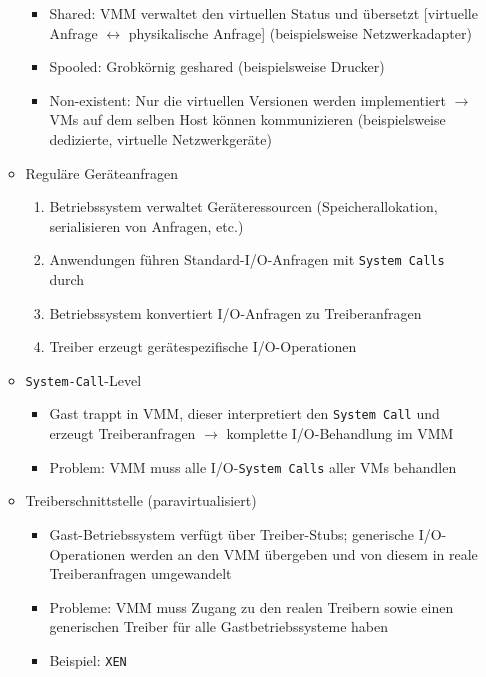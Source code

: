 \begin{itemize}
\begin{itemize}
\begin{itemize}
			\item Shared: VMM verwaltet den virtuellen Status und übersetzt [virtuelle Anfrage \(\leftrightarrow\) physikalische Anfrage] (beispielsweise Netzwerkadapter)
			\item Spooled: Grobkörnig geshared (beispielsweise Drucker)
			\item Non-existent: Nur die virtuellen Versionen werden implementiert \(\rightarrow\) VMs auf dem selben Host können kommunizieren (beispielsweise dedizierte, virtuelle Netzwerkgeräte)
		\end{itemize}
		\item Reguläre Geräteanfragen
		\begin{enumerate}
			\item Betriebssystem verwaltet Geräteressourcen (Speicherallokation, serialisieren von Anfragen, etc.)
			\item Anwendungen führen Standard-I/O-Anfragen mit \texttt{System Calls} durch
			\item Betriebssystem konvertiert I/O-Anfragen zu Treiberanfragen
			\item Treiber erzeugt gerätespezifische I/O-Operationen
		\end{enumerate}
		\item \texttt{System-Call}-Level
		\begin{itemize}
			\item Gast trappt in VMM, dieser interpretiert den \texttt{System Call} und erzeugt Treiberanfragen \(\rightarrow\) komplette I/O-Behandlung im VMM
			\item Problem: VMM muss alle I/O-\texttt{System Calls} aller VMs behandlen
		\end{itemize}
		\item Treiberschnittstelle (paravirtualisiert)
		\begin{itemize}
			\item Gast-Betriebssystem verfügt über Treiber-Stubs; generische I/O-Operationen werden an den VMM übergeben und von diesem in reale Treiberanfragen umgewandelt
			\item Probleme: VMM muss Zugang zu den realen Treibern sowie einen generischen Treiber für alle Gastbetriebssysteme haben
			\item Beispiel: \texttt{XEN}
		\end{itemize}
	\end{itemize}
\end{itemize}




























